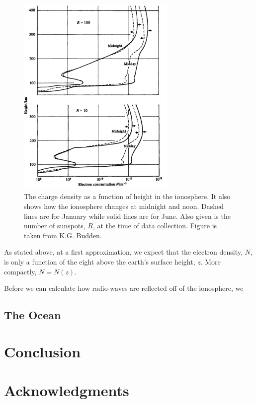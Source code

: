 \documentclass[11pt]{article}
\begin{document}
\begin{figure}[ht]
    \begin{center}
    \includegraphics[width = 3in]{figs/structure_iono.png}
    \end{center}
    \caption{The charge density as a function of height in the ionosphere. It also shows how the ionosphere changes at midnight and noon. Dashed lines are for January while solid lines are for June. Also given is the number of sunspots, $R$, at the time of data collection.  Figure is taken from K.G. Budden.\cite{budden1988propagation}}
    \label{fig:struct_ion}
\end{figure}

As stated above, at a first approximation, we expect that the electron density, $N$, is only a function of the eight above the earth's surface height, $z$. More compactly, $N = N(z)$. 

Before we can calculate how radio-waves are reflected off of the ionosphere, we

\subsection{The Ocean} %
\label{sub:the_ocean}



\section{Conclusion}
\label{sec: conclusion}

\section*{Acknowledgments}
\label{sec: acknowledge}


\newpage 

\nocite{*}


\end{document}
